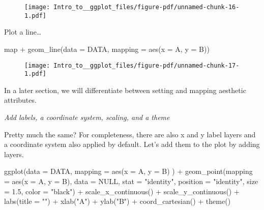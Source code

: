 \documentclass[
  letterpaper,
  DIV=11,
  numbers=noendperiod]{scrartcl}
\newenvironment{Shaded}{\begin{snugshade}}{\end{snugshade}}
\newcommand{\AttributeTok}[1]{\textcolor[rgb]{0.40,0.45,0.13}{#1}}
\newcommand{\ConstantTok}[1]{\textcolor[rgb]{0.56,0.35,0.01}{#1}}
\newcommand{\FloatTok}[1]{\textcolor[rgb]{0.68,0.00,0.00}{#1}}
\newcommand{\FunctionTok}[1]{\textcolor[rgb]{0.28,0.35,0.67}{#1}}
\newcommand{\NormalTok}[1]{\textcolor[rgb]{0.00,0.23,0.31}{#1}}
\newcommand{\SpecialCharTok}[1]{\textcolor[rgb]{0.37,0.37,0.37}{#1}}
\newcommand{\StringTok}[1]{\textcolor[rgb]{0.13,0.47,0.30}{#1}}
\begin{document}
\begin{figure}[H]

{\centering \texttt{[image: Intro\_to\_\_ggplot\_files/figure-pdf/unnamed-chunk-16-1.pdf]}

}

\end{figure}

Plot a line\ldots{}

\begin{Shaded}
\begin{Highlighting}[]
\NormalTok{map }\SpecialCharTok{+} 
  \FunctionTok{geom\_line}\NormalTok{(}\AttributeTok{data =}\NormalTok{ DATA, }
            \AttributeTok{mapping =} \FunctionTok{aes}\NormalTok{(}\AttributeTok{x =}\NormalTok{ A, }\AttributeTok{y =}\NormalTok{ B))}
\end{Highlighting}
\end{Shaded}

\begin{figure}[H]

{\centering \texttt{[image: Intro\_to\_\_ggplot\_files/figure-pdf/unnamed-chunk-17-1.pdf]}

}

\end{figure}

In a later section, we will differentiate between setting and mapping
aesthetic attributes.

\emph{Add labels, a coordinate system, scaling, and a theme}

Pretty much the same? For completeness, there are also x and y label
layers and a coordinate system also applied by default. Let's add them
to the plot by adding layers.

\begin{Shaded}
\begin{Highlighting}[]
\FunctionTok{ggplot}\NormalTok{(}\AttributeTok{data =}\NormalTok{ DATA, }
       \AttributeTok{mapping =} \FunctionTok{aes}\NormalTok{(}\AttributeTok{x =}\NormalTok{ A, }\AttributeTok{y =}\NormalTok{ B)}
\NormalTok{       ) }\SpecialCharTok{+}
  \FunctionTok{geom\_point}\NormalTok{(}\AttributeTok{mapping =} \FunctionTok{aes}\NormalTok{(}\AttributeTok{x =}\NormalTok{ A, }\AttributeTok{y =}\NormalTok{ B),   }
             \AttributeTok{data =} \ConstantTok{NULL}\NormalTok{, }
             \AttributeTok{stat =} \StringTok{"identity"}\NormalTok{, }
             \AttributeTok{position =} \StringTok{"identity"}\NormalTok{, }
             \AttributeTok{size =} \FloatTok{1.5}\NormalTok{,}
             \AttributeTok{color =} \StringTok{"black"}\NormalTok{) }\SpecialCharTok{+}
  \FunctionTok{scale\_x\_continuous}\NormalTok{() }\SpecialCharTok{+}
  \FunctionTok{scale\_y\_continuous}\NormalTok{() }\SpecialCharTok{+}
  \FunctionTok{labs}\NormalTok{(}\AttributeTok{title =} \StringTok{""}\NormalTok{) }\SpecialCharTok{+}
  \FunctionTok{xlab}\NormalTok{(}\StringTok{"A"}\NormalTok{) }\SpecialCharTok{+}
  \FunctionTok{ylab}\NormalTok{(}\StringTok{"B"}\NormalTok{) }\SpecialCharTok{+}
  \FunctionTok{coord\_cartesian}\NormalTok{() }\SpecialCharTok{+}
  \FunctionTok{theme}\NormalTok{()}
\end{Highlighting}
\end{Shaded}
\end{document}
